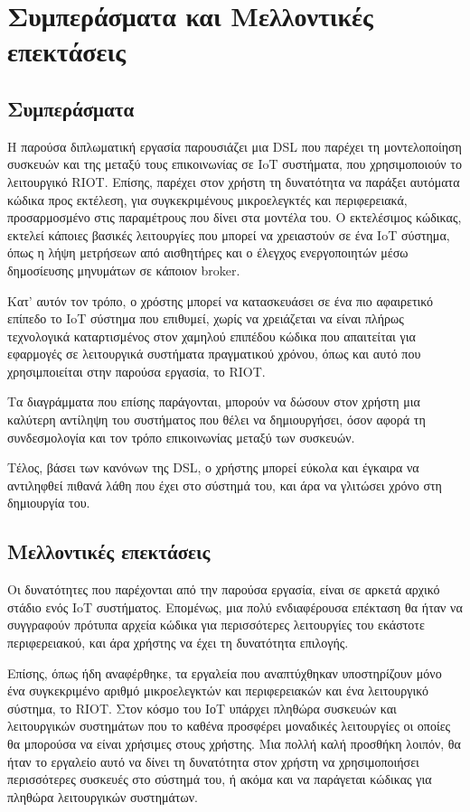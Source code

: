 \chapter{Συμπεράσματα και Μελλοντικές επεκτάσεις}
\label{chapter:conclusions}

\section{Συμπεράσματα}

Η παρούσα διπλωματική εργασία παρουσιάζει μια DSL που παρέχει τη μοντελοποίηση συσκευών και της μεταξύ τους επικοινωνίας σε IoT συστήματα, που χρησιμοποιούν το λειτουργικό RIOT. Επίσης, παρέχει στον χρήστη τη δυνατότητα να παράξει αυτόματα κώδικα προς εκτέλεση, για συγκεκριμένους μικροελεγκτές και περιφερειακά, προσαρμοσμένο στις παραμέτρους που δίνει στα μοντέλα του. Ο εκτελέσιμος κώδικας, εκτελεί κάποιες βασικές λειτουργίες που μπορεί να χρειαστούν σε ένα IoT σύστημα, όπως η λήψη μετρήσεων από αισθητήρες και ο έλεγχος ενεργοποιητών μέσω δημοσίευσης μηνυμάτων σε κάποιον broker.

Κατ' αυτόν τον τρόπο, ο χρόστης μπορεί να κατασκευάσει σε ένα πιο αφαιρετικό επίπεδο το IoT σύστημα που επιθυμεί, χωρίς να χρειάζεται να είναι πλήρως τεχνολογικά καταρτισμένος στον χαμηλού επιπέδου κώδικα που απαιτείται για εφαρμογές σε λειτουργικά συστήματα πραγματικού χρόνου, όπως και αυτό που χρησιμποιείται στην παρούσα εργασία, το RIOT.

Τα διαγράμματα που επίσης παράγονται, μπορούν να δώσουν στον χρήστη μια καλύτερη αντίληψη του συστήματος που θέλει να δημιουργήσει, όσον αφορά τη συνδεσμολογία και τον τρόπο επικοινωνίας μεταξύ των συσκευών.

Τέλος, βάσει των κανόνων της DSL, ο χρήστης μπορεί εύκολα και έγκαιρα να αντιληφθεί πιθανά λάθη που έχει στο σύστημά του, και άρα να γλιτώσει χρόνο στη δημιουργία του.

\section{Μελλοντικές επεκτάσεις}

Οι δυνατότητες που παρέχονται από την παρούσα εργασία, είναι σε αρκετά αρχικό στάδιο ενός IoT συστήματος. Επομένως, μια πολύ ενδιαφέρουσα επέκταση θα ήταν να συγγραφούν πρότυπα αρχεία κώδικα για περισσότερες λειτουργίες του εκάστοτε περιφερειακού, και άρα χρήστης να έχει τη δυνατότητα επιλογής.

Επίσης, όπως ήδη αναφέρθηκε, τα εργαλεία που αναπτύχθηκαν υποστηρίζουν μόνο ένα συγκεκριμένο αριθμό μικροελεγκτών και περιφερειακών και ένα λειτουργικό σύστημα, το RIOT. Στον κόσμο του ΙοΤ υπάρχει πληθώρα συσκευών και λειτουργικών συστημάτων που το καθένα προσφέρει μοναδικές λειτουργίες οι οποίες θα μπορούσα να είναι χρήσιμες στους χρήστης. Μια πολλή καλή προσθήκη λοιπόν, θα ήταν το εργαλείο αυτό να δίνει τη δυνατότητα στον χρήστη να χρησιμοποιήσει περισσότερες συσκευές στο σύστημά του, ή ακόμα και να παράγεται κώδικας για πληθώρα λειτουργικών συστημάτων.

